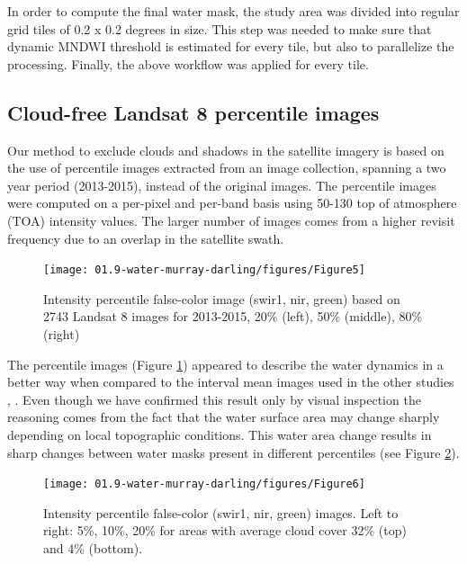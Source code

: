 In order to compute the final water mask, the study area was divided into regular grid tiles of 0.2 x 0.2 degrees in size. This step was needed to make sure that dynamic MNDWI threshold is estimated for every tile, but also to parallelize the processing. Finally, the above workflow was applied for every tile.

\subsection{Cloud-free Landsat 8 percentile images}
Our method to exclude clouds and shadows in the satellite imagery is based on the use of percentile images extracted from an image collection, spanning a two year period (2013-2015), instead of the original images. The percentile images were computed on a per-pixel and per-band basis using 50-130 top of atmosphere (TOA) intensity values. The larger number of images comes from a higher revisit frequency due to an overlap in the satellite swath. 

\begin{figure}
	\centering
	\texttt{[image: 01.9-water-murray-darling/figures/Figure5]}
	\caption{Intensity percentile false-color image (swir1, nir, green) based on 2743 Landsat 8 images for 2013-2015, 20\% (left), 50\% (middle), 80\% (right)}
	\label{fig:au-percentiles}
\end{figure}

The percentile images (Figure \ref{fig:au-percentiles}) appeared to describe the water dynamics in a better way when  compared to the interval mean images used in the other studies \citep{Potapov2012}, \citep{Hansen2013}. Even though we have confirmed this result only by visual inspection the reasoning comes from the fact that the water surface area may change sharply depending on local topographic conditions. This water area change results in sharp changes between water masks present in different percentiles (see Figure \ref{fig:au-percentiles-clouds}). 

\begin{figure}
	\centering
	\texttt{[image: 01.9-water-murray-darling/figures/Figure6]}
	\caption{Intensity percentile false-color (swir1, nir, green) images. Left to right: 5\%, 10\%, 20\% for areas with average cloud cover 32\% (top) and 4\% (bottom). }
	\label{fig:au-percentiles-clouds}
\end{figure}

